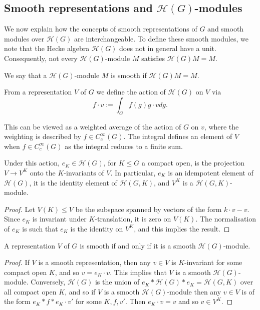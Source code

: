 \subsection{Smooth representations and $\mathcal H(G)$-modules}

We now explain how the concepts of smooth representations of $G$ and smooth modules over $\mathcal H(G)$ are interchangeable. To define these smooth modules, we note that the Hecke algebra $\mathcal H(G)$ does not in general have a unit. Consequently, not every $\mathcal H(G)$-module $M$ satisfies $\mathcal H(G) M = M$. 

\begin{defn}
    We say that a $\mathcal H(G)$-module $M$ is smooth if $\mathcal H(G) M = M$. 
\end{defn}

\begin{defn}
From a representation $V$ of $G$ we define the action of $\mathcal H(G)$ on $V$ via 
$$f \cdot v := \int_G f(g) g \cdot v dg.$$
\end{defn}
This can be viewed as a weighted average of the action of $G$ on $v$, where the weighting is described by $f \in C_c^\infty(G)$. The integral defines an element of $V$ when $f \in C_c^\infty(G)$ as the integral reduces to a finite sum.

\begin{lemma}\label{project}
    Under this action, $e_K \in \mathcal H(G)$, for $K\leq G$ a compact open, is the projection $V \to V^K$ onto the $K$-invariants of $V$. In particular, $e_K$ is an idempotent element of $\mathcal H(G)$, it is the identity element of $\mathcal H(G,K)$, and $V^K$ is a $\mathcal H(G,K)$-module.
\end{lemma}
\begin{proof}
    Let $V(K) \leq V$ be the subspace spanned by vectors of the form $k \cdot v-v$. Since $e_K$ is invariant under $K$-translation, it is zero on $V(K)$. The normalisation of $e_K$ is such that $e_K$ is the identity on $V^K$, and this implies the result.
\end{proof}


\begin{prop}
    A representation $V$ of $G$ is smooth if and only if it is a smooth $\mathcal H(G)$-module.
\end{prop}
\begin{proof}
If $V$ is a smooth representation, then any $v \in V$ is $K$-invariant for some compact open $K$, and so $v=e_K \cdot v$. This implies that $V$ is a smooth $\mathcal H(G)$-module. Conversely, $\mathcal H(G)$ is the union of $e_K* \mathcal H(G) *e_K = \mathcal H(G,K)$ over all compact open $K$, and so if $V$ is a smooth $\mathcal H(G)$-module then any $v \in V$ is of the form $e_K * f * e_K \cdot v'$ for some $K, f, v'$. Then $e_K \cdot v=v$ and so $v \in V^K$.
\end{proof}

